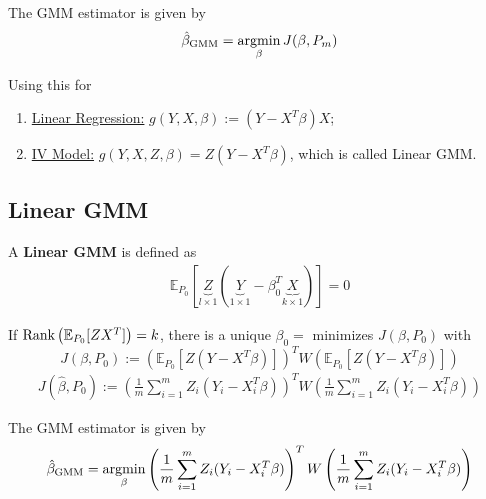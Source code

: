 \documentclass[11pt]{elegantbook}
\newcommand{\argmin}{\operatornamewithlimits{argmin}}
\begin{document}
The GMM estimator is given by
\begin{equation}
    \begin{aligned}
        \hat{\beta}_\textnormal{GMM}=\argmin_{\beta}J(\beta,P_m)
    \end{aligned}
    \nonumber
\end{equation}

Using this for
\begin{enumerate}
    \item \underline{Linear Regression:} $g(Y,X,\beta):=(Y-X^T\beta)X$;
    \item \underline{IV Model:} $g(Y,X,Z,\beta)=Z(Y-X^T\beta)$, which is called Linear GMM.
\end{enumerate}

\subsection{Linear GMM}
\begin{definition}
    \normalfont
    A \textbf{Linear GMM} is defined as
    \begin{equation}
        \begin{aligned}
            \mathbb{E}_{P_0}[\underbrace{Z}_{l\times 1}(\underbrace{Y}_{1\times 1}-\beta_0^T\underbrace{X}_{k\times 1})]=0
        \end{aligned}
        \nonumber
    \end{equation}
\end{definition}

If $\textnormal{Rank}\left(\mathbb{E}_{P_0}[ZX^T]\right)=k$, there is a unique $\beta_0=$ minimizes $J(\beta,P_0)$ with $$J(\beta,P_0):=\left(\mathbb{E}_{P_0}[Z(Y-X^T\beta)]\right)^TW\left(\mathbb{E}_{P_0}[Z(Y-X^T\beta)]\right)$$
\begin{equation}
    \begin{aligned}
        J(\hat{\beta},P_0):=\left(\frac{1}{m}\sum_{i=1}^mZ_i(Y_i-X_i^T\beta)\right)^TW\left(\frac{1}{m}\sum_{i=1}^mZ_i(Y_i-X_i^T\beta)\right)
    \end{aligned}
    \nonumber
\end{equation}

The GMM estimator is given by
\begin{equation}
    \begin{aligned}
        \hat{\beta}_\textnormal{GMM}
        =\argmin_{\beta}\left(\frac{1}{m}\sum_{i=1}^mZ_i(Y_i-X_i^T\beta)\right)^TW\left(\frac{1}{m}\sum_{i=1}^mZ_i(Y_i-X_i^T\beta)\right)
    \end{aligned}
    \label{GMM_est}
\end{equation}
\end{document}
